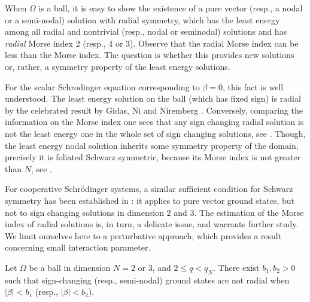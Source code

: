 \documentclass[reqno]{amsart}
\begin{document}
 When $\Omega$ is a ball, it is easy to show the existence of a pure vector
 (resp., a nodal or a semi-nodal) solution with radial symmetry,  which has the
least energy among all radial and nontrivial (resp., nodal or seminodal) solutions
and has \emph{radial} Morse index 2 (resp., 4 or 3).
Observe that the radial Morse index can be less than the Morse index.
The question is whether this provides new solutions or, rather, a symmetry property
of the least energy solutions.

For the scalar Schrodinger equation corresponding to $\beta=0$, this fact is well
understood. The least energy solution on the ball (which has fixed sign) is radial
by the celebrated result by Gidas, Ni and Niremberg \cite{GNN}.
Conversely, comparing the information on the Morse index one sees that any sign
changing radial solution  is not the least energy one in the whole set of sign
changing solutions, see \cite{AftPac}.
Though, the least energy nodal solution inherits some symmetry property of the
domain, precisely it is foliated Schwarz symmetric, because its Morse index is not
greater than $N$, see \cite{PacWet}.

For cooperative Schr\"odinger  systems, a similar sufficient condition for Schwarz
symmetry has been established in \cite{DamPac}: it applies to pure vector ground states,
but not to sign changing solutions in dimension $2$ and $3$.
The estimation of the Morse index of radial solutions  is, in turn, a delicate issue,
and warrants further study.
We limit ourselves here to a perturbative approach, which provides a result concerning
small interaction parameter.

\begin{theorem}\label{thm:symmetry_breaking}
Let $\Omega$ be a ball in dimension $N=2$ or $3$, and $2\le q<q_N$.
There exist $b_1  , b_2> 0$ such that sign-changing (resp., semi-nodal) ground states
are not radial when $|\beta|<b_1$ (resp., $|\beta|<b_2$).
\end{theorem}
\end{document}
